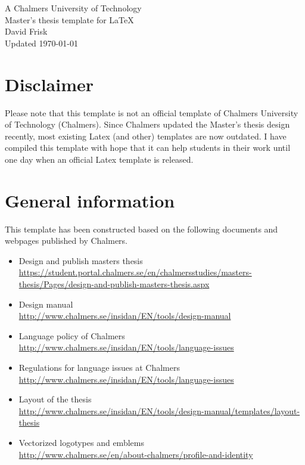 \documentclass[11pt,a4paper]{article}                    			%
\numberwithin{figure}{section}                         %
\numberwithin{table}{section}                         	%
\begin{document}
\begin{center}
{\Large A Chalmers University of Technology\\ Master's thesis template for \LaTeX}\\ [5mm]
David Frisk\\ [5mm]
Updated \today
\end{center}

\section*{Disclaimer}
Please note that this template is not an official template of Chalmers University of Technology (Chalmers). Since Chalmers updated the Master's thesis design recently, most existing Latex (and other) templates are now outdated. I have compiled this template with hope that it can help students in their work until one day when an official Latex template is released.

\tableofcontents

\section{General information}
This template has been constructed based on the following documents and webpages published by Chalmers.

\begin{itemize}
\item Design and publish masters thesis \\ \url{https://student.portal.chalmers.se/en/chalmersstudies/masters-thesis/Pages/design-and-publish-masters-thesis.aspx}

\item Design manual \\ \url{http://www.chalmers.se/insidan/EN/tools/design-manual}

\item Language policy of Chalmers \\\url{http://www.chalmers.se/insidan/EN/tools/language-issues}

\item Regulations for language issues at Chalmers \\ \url{http://www.chalmers.se/insidan/EN/tools/language-issues}

\item Layout of the thesis \\ \url{http://www.chalmers.se/insidan/EN/tools/design-manual/templates/layout-thesis}

\item Vectorized logotypes and emblems \\ \url{http://www.chalmers.se/en/about-chalmers/profile-and-identity}

\end{itemize}
\end{document}
